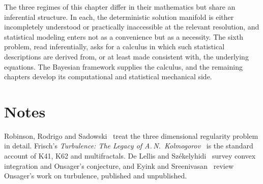 The three regimes of this chapter differ in their mathematics but share an inferential structure. In each, the deterministic solution manifold is either incompletely understood or practically inaccessible at the relevant resolution, and statistical modeling enters not as a convenience but as a necessity. The sixth problem, read inferentially, asks for a calculus in which such statistical descriptions are derived from, or at least made consistent with, the underlying equations. The Bayesian framework supplies the calculus, and the remaining chapters develop its computational and statistical mechanical side.



\section*{Notes}

Robinson, Rodrigo and Sadowski~\cite{robinson2016} treat the three dimensional regularity problem in detail. Frisch's \emph{Turbulence: The Legacy of A.\,N.~Kolmogorov}~\cite{frisch1995} is the standard account of K41, K62 and multifractals. De Lellis and Sz\'ekelyhidi~\cite{delellisszekelyhidi2017} survey convex integration and Onsager's conjecture, and Eyink and Sreenivasan~\cite{eyinksreenivasan2006} review Onsager's work on turbulence, published and unpublished.
